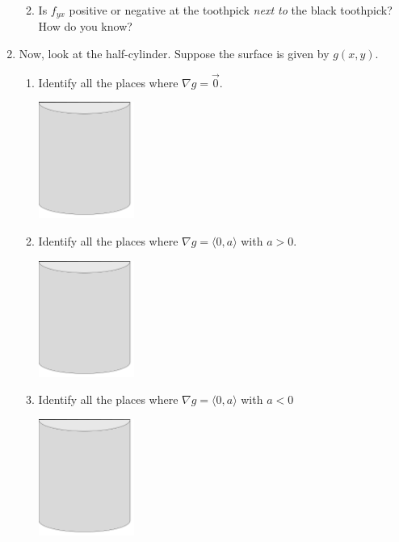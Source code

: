 \documentclass[12pt]{amsart}
\begin{document}
\begin{enumerate}
\begin{enumerate}
\vspace{0.5in}


\item
Is $f_{yx}$ positive or negative at the toothpick \emph{next to} the black toothpick?  How do you know?

\vspace{0.5in}




\end{enumerate}
\newpage
\item
Now, look at the half-cylinder.  Suppose the surface is given by $g(x,y)$.
\begin{multicols}{2}
\begin{enumerate}
\item
Identify all the places where $\nabla g = \vec 0$.

\bigskip
\begin{center}
\includegraphics[height=1.5in]{0928-cylinder.png}
\end{center}

\item
Identify all the places where $\nabla g = \langle 0, a \rangle$ with $a >0$.

\bigskip
\begin{center}
\includegraphics[height=1.5in]{0928-cylinder.png}
\end{center}

\item
Identify all the places where $\nabla g = \langle 0, a \rangle$ with $a <0$

\bigskip
\begin{center}
\includegraphics[height=1.5in]{0928-cylinder.png}
\end{center}


\end{enumerate}
\end{multicols}
\end{enumerate}
\end{document}

